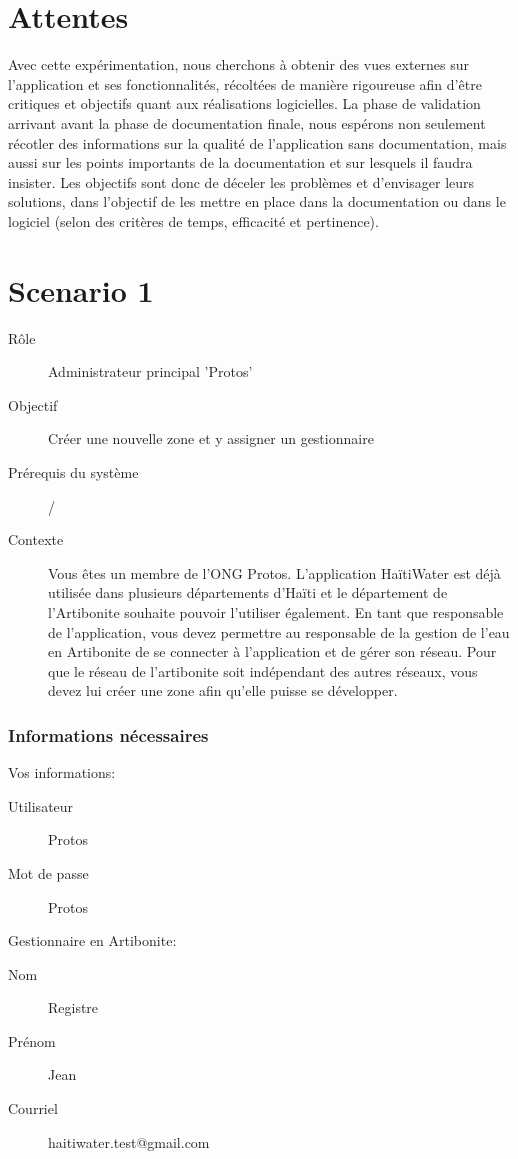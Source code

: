 \documentclass[a4paper, 11pt]{article}
\begin{document}
\section{Attentes}
    Avec cette expérimentation, nous cherchons à obtenir des vues externes sur l'application et ses fonctionnalités, récoltées de manière rigoureuse afin d'être critiques et objectifs quant aux réalisations logicielles. La phase de validation arrivant avant la phase de documentation finale, nous espérons non seulement récotler des informations sur la qualité de l'application sans documentation, mais aussi sur les points importants de la documentation et sur lesquels il faudra insister. Les objectifs sont donc de déceler les problèmes et d'envisager leurs solutions, dans l'objectif de les mettre en place dans la documentation ou dans le logiciel (selon des critères de temps, efficacité et pertinence).

\newpage
\section*{Scenario 1}
    \begin{description}
        \item[Rôle] Administrateur principal 'Protos'
        \item[Objectif] Créer une nouvelle zone et y assigner un gestionnaire
        \item[Prérequis du système] /
        \item[Contexte] Vous êtes un membre de l’ONG Protos. L’application HaïtiWater est déjà utilisée dans plusieurs départements d’Haïti et le département de l’Artibonite souhaite pouvoir l’utiliser également. En tant que responsable de l’application, vous devez permettre au responsable de la gestion de l’eau en Artibonite de se connecter à l’application et de gérer son réseau. Pour que le réseau de l’artibonite soit indépendant des autres réseaux, vous devez lui créer une zone afin qu’elle puisse se développer.
    \end{description}

    \subsubsection*{Informations nécessaires}
        \begin{multicols}{2}
            Vos informations:
            \begin{description}
                \item[Utilisateur] Protos
                \item[Mot de passe] Protos
            \end{description}
            \vfill\null
            \columnbreak

            Gestionnaire en Artibonite:
            \begin{description}
                \item[Nom] Registre
                \item[Prénom] Jean
                \item[Courriel] haitiwater.test@gmail.com
            \end{description}
        \end{multicols}
\end{document}
